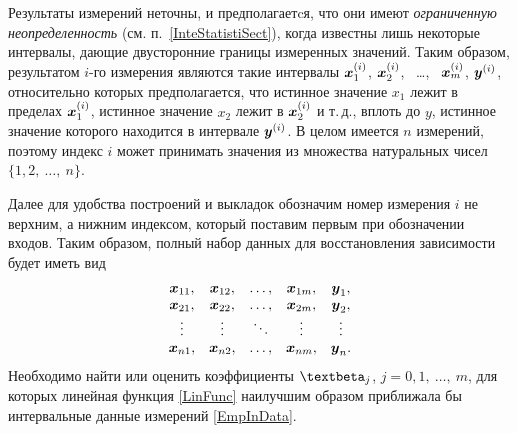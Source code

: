 \documentclass[a5paper,openany]{book}
\newcommand{\mbf}[1]{\protect\text{\boldmath$#1$}}
\renewcommand{\beta}{\text{\textbeta}}
\begin{document}
Результаты измерений неточны, и предполагаетcя, что они имеют \emph{ограниченную 
	неопределенность} (см. п.~\ref{InteStatistiSect}), когда известны лишь некоторые 
интервалы, дающие двусторонние границы измеренных значений. Таким образом, результатом 
$i$-го измерения являются такие интервалы $\mbf{x}^{(i)}_{1}$, $\mbf{x}^{(i)}_{2}$, 
\ \ldots, \ $\mbf{x}^{(i)}_{m}$, $\mbf{y}^{(i)}$, относительно которых предполагается, 
что истинное значение $x_1$ лежит в пределах $\mbf{x}^{(i)}_{1}$, истинное значение $x_2$ 
лежит в $\mbf{x}^{(i)}_{2}$ и т.\,д., вплоть до $y$, истинное значение которого находится 
в интервале $\mbf{y}^{(i)}$. В целом имеется $n$ измерений, поэтому индекс $i$ может 
принимать значения из множества натуральных чисел $\{ 1,2, \ \ldots, \ n \}$. 

Далее для удобства построений и выкладок обозначим номер измерения $i$ не верхним, 
а нижним индексом, который поставим первым при обозначении входов. Таким образом, 
полный набор данных для восстановления зависимости будет иметь вид 
\begin{equation} 
	\label{EmpInData} 
	\begin{array}{ccccc} 
		\mbf{x}_{11}, & \mbf{x}_{12}, & \ldots, & \mbf{x}_{1m}, & \mbf{y}_{1}, \\
		\mbf{x}_{21}, & \mbf{x}_{22}, & \ldots, & \mbf{x}_{2m}, & \mbf{y}_{2}, \\
		\vdots      &   \vdots      & \ddots &   \vdots      &  \vdots      \\
		\mbf{x}_{n1}, & \mbf{x}_{n2}, & \ldots, & \mbf{x}_{nm}, & \mbf{y}_{n}. 
	\end{array}
\end{equation} 
Необходимо найти или оценить коэффициенты $\beta_j$, $j = 0,1, \ \ldots, \ m$, 
для которых линейная функция \eqref{LinFunc} наилучшим образом приближала бы 
интервальные данные измерений \eqref{EmpInData}. 
\end{document}
